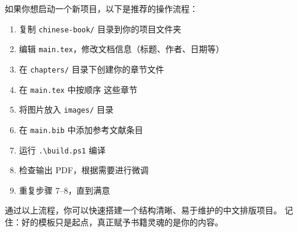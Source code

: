 如果你想启动一个新项目，以下是推荐的操作流程：

\begin{solutions}[快速启动清单]
\begin{enumerate}
    \item 复制 \texttt{chinese-book/} 目录到你的项目文件夹
    \item 编辑 \texttt{main.tex}，修改文档信息（标题、作者、日期等）
    \item 在 \texttt{chapters/} 目录下创建你的章节文件
    \item 在 \texttt{main.tex} 中按顺序 \lstinline|| 这些章节
    \item 将图片放入 \texttt{images/} 目录
    \item 在 \texttt{main.bib} 中添加参考文献条目
    \item 运行 \texttt{.\textbackslash build.ps1} 编译
    \item 检查输出 PDF，根据需要进行微调
    \item 重复步骤 7--8，直到满意
\end{enumerate}
\end{solutions}

通过以上流程，你可以快速搭建一个结构清晰、易于维护的中文排版项目。
记住：好的模板只是起点，真正赋予书籍灵魂的是你的内容。
